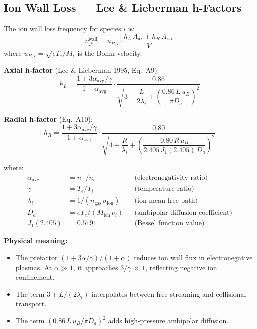 \documentclass[11pt,a4paper]{article}
\begin{document}
\subsection{Ion Wall Loss --- Lee \& Lieberman h-Factors}

The ion wall loss frequency for species $i$ is:
\begin{equation}
  \nu_{i^+}^\text{wall} = u_{B,i}\cdot\frac{h_L\,A_\text{ax} + h_R\,A_\text{rad}}{V}
\end{equation}
where $u_{B,i} = \sqrt{eT_e/M_i}$ is the Bohm velocity.

\textbf{Axial h-factor} (Lee \& Lieberman 1995, Eq.~A9):
\begin{equation}\label{eq:hL}
  \boxed{h_L = \frac{1 + 3\alpha_\text{avg}/\gamma}{1 + \alpha_\text{avg}} \cdot \frac{0.86}{\sqrt{3 + \dfrac{L}{2\lambda_i} + \left(\dfrac{0.86\,L\,u_B}{\pi D_a}\right)^{\!2}}}}
\end{equation}

\textbf{Radial h-factor} (Eq.~A10):
\begin{equation}\label{eq:hR}
  \boxed{h_R = \frac{1 + 3\alpha_\text{avg}/\gamma}{1 + \alpha_\text{avg}} \cdot \frac{0.80}{\sqrt{4 + \dfrac{R}{\lambda_i} + \left(\dfrac{0.80\,R\,u_B}{2.405\,J_1(2.405)\,D_a}\right)^{\!2}}}}
\end{equation}

where:
\begin{align}
  \alpha_\text{avg} &= n^-/n_e & &\text{(electronegativity ratio)} \\
  \gamma &= T_e/T_i & &\text{(temperature ratio)} \\
  \lambda_i &= 1/(n_\text{gas}\,\sigma_\text{ion}) & &\text{(ion mean free path)} \\
  D_a &= eT_e/(M_\text{ion}\,\nu_i) & &\text{(ambipolar diffusion coefficient)} \\
  J_1(2.405) &= 0.5191 & &\text{(Bessel function value)}
\end{align}

\textbf{Physical meaning:}
\begin{itemize}[nosep]
  \item The prefactor $(1+3\alpha/\gamma)/(1+\alpha)$ reduces ion wall flux in electronegative plasmas. At $\alpha\gg1$, it approaches $3/\gamma \ll 1$, reflecting negative ion confinement.
  \item The term $3 + L/(2\lambda_i)$ interpolates between free-streaming and collisional transport.
  \item The term $(0.86\,L\,u_B/\pi D_a)^2$ adds high-pressure ambipolar diffusion.
\end{itemize}
\end{document}
